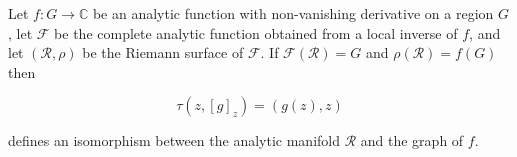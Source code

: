 Let $f: G \to \mathbb{C}$ be an analytic function with non-vanishing derivative on a region $G$, let $\mathcal{F}$ be the complete analytic function obtained from a local inverse of $f$, and let $(\mathcal{R}, \rho)$ be the Riemann surface of $\mathcal{F}$. If $\mathcal{F}(\mathcal{R}) = G$ and $\rho(\mathcal{R}) = f(G)$ then

$$\tau(z, [g]_z) = (g(z), z)$$

defines an isomorphism between the analytic manifold $\mathcal{R}$ and the graph of $f$.
